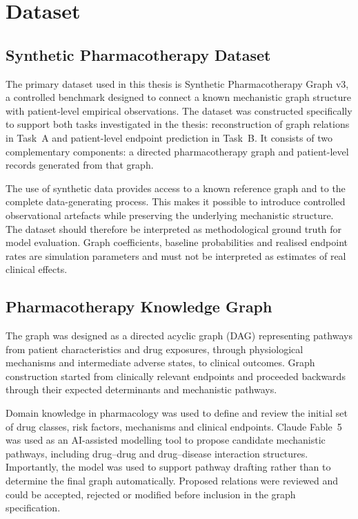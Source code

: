 \chapter{Dataset}
\label{ch:dataset}

\section{Synthetic Pharmacotherapy Dataset}

The primary dataset used in this thesis is Synthetic Pharmacotherapy Graph v3, a controlled benchmark designed to connect a known mechanistic graph structure with patient-level empirical observations.
The dataset was constructed specifically to support both tasks investigated in the thesis: reconstruction of graph relations in Task~A and patient-level endpoint prediction in Task~B.
It consists of two complementary components: a directed pharmacotherapy graph and patient-level records generated from that graph.

The use of synthetic data provides access to a known reference graph and to the complete data-generating process.
This makes it possible to introduce controlled observational artefacts while preserving the underlying mechanistic structure.
The dataset should therefore be interpreted as methodological ground truth for model evaluation.
Graph coefficients, baseline probabilities and realised endpoint rates are simulation parameters and must not be interpreted as estimates of real clinical effects.

\section{Pharmacotherapy Knowledge Graph}

The graph was designed as a directed acyclic graph (DAG) representing pathways from patient characteristics and drug exposures, through physiological mechanisms and intermediate adverse states, to clinical outcomes.
Graph construction started from clinically relevant endpoints and proceeded backwards through their expected determinants and mechanistic pathways.

Domain knowledge in pharmacology was used to define and review the initial set of drug classes, risk factors, mechanisms and clinical endpoints.
Claude Fable~5 was used as an AI-assisted modelling tool to propose candidate mechanistic pathways, including drug--drug and drug--disease interaction structures.
Importantly, the model was used to support pathway drafting rather than to determine the final graph automatically.
Proposed relations were reviewed and could be accepted, rejected or modified before inclusion in the graph specification.


